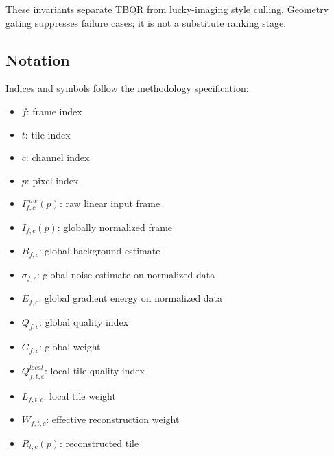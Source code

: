 \documentclass[10pt,twocolumn]{article}
\begin{document}
These invariants separate TBQR from lucky-imaging style culling. Geometry gating suppresses failure cases; it is not a substitute ranking stage.

\subsection{Notation}

Indices and symbols follow the methodology specification:
\begin{itemize}
  \item $f$: frame index
  \item $t$: tile index
  \item $c$: channel index
  \item $p$: pixel index
  \item $I_{f,c}^{raw}(p)$: raw linear input frame
  \item $I_{f,c}(p)$: globally normalized frame
  \item $B_{f,c}$: global background estimate
  \item $\sigma_{f,c}$: global noise estimate on normalized data
  \item $E_{f,c}$: global gradient energy on normalized data
  \item $Q_{f,c}$: global quality index
  \item $G_{f,c}$: global weight
  \item $Q_{f,t,c}^{local}$: local tile quality index
  \item $L_{f,t,c}$: local tile weight
  \item $W_{f,t,c}$: effective reconstruction weight
  \item $R_{t,c}(p)$: reconstructed tile
\end{itemize}
\end{document}
